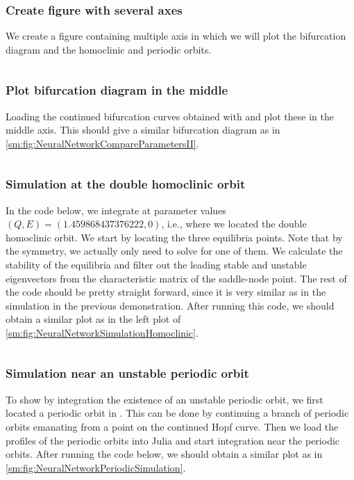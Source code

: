 \subsubsection{Create figure with several axes}
We create a figure containing multiple axis in which we will plot the bifurcation diagram and
the homoclinic and periodic orbits.
\inputminted[firstline=63, lastline=73]{julia}{\pathToJuliaFiles/neural_network_model_simulation_article.jl}

\subsubsection{Plot bifurcation diagram in the middle}
Loading the continued bifurcation curves obtained with \DDEBIFTOOL and plot these in the middle axis.
This should give a similar bifurcation diagram as in \cref{sm:fig:NeuralNetworkCompareParametersII}.
\inputminted[firstline=76, lastline=102]{julia}{\pathToJuliaFiles/neural_network_model_simulation_article.jl}

\subsubsection{Simulation at the double homoclinic orbit}
In the code below, we integrate at parameter values $(Q,E)=(1.459868437376222,0)$, i.e.,
where we located the double homoclinic orbit. We start by locating the three equilibria
points. Note that by the symmetry, we actually only need to solve for one of them.
We calculate the stability of the equilibria and filter out the leading stable and unstable
eigenvectors from the characteristic matrix of the saddle-node point. 
The rest of the code should be pretty straight forward,
since it is very similar as in the simulation in the previous demonstration.
After running this code, we should obtain a similar plot as in
the left plot of \cref{sm:fig:NeuralNetworkSimulationHomoclinic}.
\inputminted[firstline=105, lastline=166]{julia}{\pathToJuliaFiles/neural_network_model_simulation_article.jl}

\subsubsection{Simulation near an unstable periodic orbit}
To show by integration the existence of an unstable periodic orbit, we first
located a periodic orbit in \DDEBIFTOOL. This can be done by continuing a
branch of periodic orbits emanating from a point on the continued Hopf curve.
Then we load the profiles of the periodic orbits into Julia and start
integration near the periodic orbits.  After running the code below, we should
obtain a similar plot as in
\cref{sm:fig:NeuralNetworkPeriodicSimulation}.
\inputminted[firstline=169, lastline=208]{julia}{\pathToJuliaFiles/neural_network_model_simulation_article.jl}




